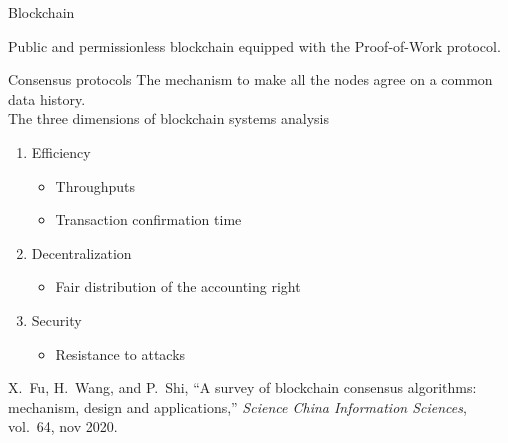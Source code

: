 \documentclass{beamer}
\begin{document}
\begin{frame}{Blockchain}
\vspace{0.2cm}
\begin{tcolorbox}[enhanced,drop shadow, title=Focus of the talk]
Public and permissionless blockchain equipped with the Proof-of-Work protocol.
\end{tcolorbox}
\end{frame}

\begin{frame}{Consensus protocols}
The mechanism to make all the nodes agree on a common data history.\\
\vspace{0.3cm}
The three dimensions of blockchain systems analysis
\begin{enumerate}
  \item Efficiency
  \begin{itemize}
    \item Throughputs
    \item Transaction confirmation time
  \end{itemize}
  \item Decentralization
  \begin{itemize}
    \item Fair distribution of the accounting right
  \end{itemize}
  \item Security 
  \begin{itemize}
    \item Resistance to attacks
  \end{itemize}
\end{enumerate}
\footnotesize
\begin{thebibliography}{1}
X.~Fu, H.~Wang, and P.~Shi, ``A survey of blockchain consensus algorithms:
  mechanism, design and applications,'' {\em Science China Information
  Sciences}, vol.~64, nov 2020.
\end{thebibliography}
\end{frame}
\end{document}
